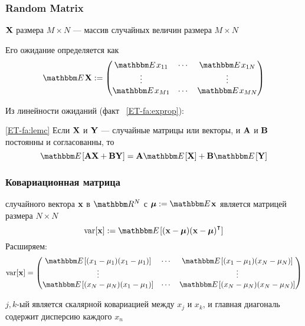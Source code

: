 \begin{frame}\frametitle{Random Matrix}

    \vspace{2em}
     $\mathbf X$ размера $M \times N$ --- массив случайных величин 
    размера $M \times N$
    
    Его ожидание определяется как
    \begin{equation*}
        \EE \boldX
        := 
        \begin{pmatrix}
            \EE x_{11} & \cdots & \EE x_{1N} \\
            \vdots &  & \vdots \\
            \EE x_{M1} & \cdots & \EE x_{MN}
        \end{pmatrix}
    \end{equation*}
    
\end{frame}

\begin{frame}

    \vspace{2em}
    Из линейности ожиданий (факт ~\ref{ET-fa:exprop}):
    
    \Fact\eqref{ET-fa:lemc}
    Если $\mathbf X$ и $\mathbf Y$ --- случайные матрицы или векторы, и $\mathbf A$ и
    $\mathbf B$ постоянны и согласованны, то
    \begin{equation*}
        \EE [ \boldA \boldX + \boldB \boldY ]
            =  \boldA \EE [\boldX ] + \boldB \EE[\boldY]
    \end{equation*}

\end{frame}

\begin{frame}\frametitle{Ковариационная матрица}

    \vspace{2em}
     случайного вектора ${\mathbf x}$ в $\RR^N$ с 
    $\boldmu := \EE \boldx$ является матрицей размера $N \times N$ 
    \begin{equation*}
        \label{eq:vcd1}
        \var [\boldx] := \EE [ (\boldx - \boldmu) (\boldx - \boldmu)^\T]
    \end{equation*}
    Расширяем:
    \small
    \begin{equation*}
        \var [\boldx]
        = 
        \begin{pmatrix}
            \EE [(x_1 - \mu_1)(x_1 - \mu_1)]
                & \cdots & \EE [(x_1 - \mu_1)(x_N - \mu_N)] \\
            \vdots & & \vdots \\
            \EE [(x_N - \mu_N)(x_1 - \mu_1)]  
                & \cdots & \EE [(x_N - \mu_N)(x_N - \mu_N)] \\
        \end{pmatrix}
    \end{equation*}
    \normalsize
    
    $j,k$-ый является скалярной ковариацией между $x_j$ и $x_k$, и
    главная диагональ содержит дисперсию каждого $x_n$
    
\end{frame}

